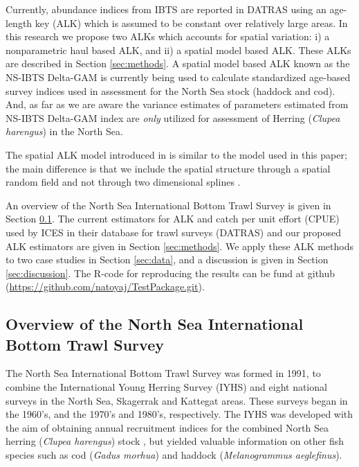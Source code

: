 \documentclass[a4paper 12pt]{article}
\numberwithin{equation}{section}
\begin{document}
Currently, abundance indices from IBTS are reported in DATRAS \citep{datras} using an age-length key (ALK) \citep{fridriksson1934calculation} which is assumed to be constant over relatively large areas. In this research we propose two ALKs which accounts for spatial variation: i) a nonparametric  haul based ALK, and ii) a spatial model based ALK. These ALKs are described in Section \ref{sec:methods}. %
A spatial model based ALK \citep{berg2012spatial, berg2014evaluation} known as the NS-IBTS Delta-GAM \citep{ICES2016b} is currently being used to calculate standardized age-based survey indices used in assessment for the North Sea stock (haddock and cod). And, as far as we are aware the variance estimates of parameters estimated from NS-IBTS Delta-GAM index  are \textit{only} utilized for assessment of Herring (\textit{Clupea harengus}) in the North Sea.

The spatial ALK model introduced in \citet{berg2012spatial} is similar to the model used in this paper; the main difference is that we include the spatial structure through a spatial random field \citep{lindgren2011explicit} and not through two dimensional splines \citep{wood2017generalized}.

 An  overview of the  North Sea International Bottom Trawl Survey is given in Section \ref{overview}. The current estimators for ALK and catch per unit effort (CPUE) used by ICES in their database for trawl surveys (DATRAS) and our proposed ALK estimators are given in Section \ref{sec:methods}. We apply these ALK methods to two case studies in Section  \ref{sec:data}, and a discussion is given in Section \ref{sec:discussion}. The R-code for reproducing the results can be fund at github (\href{https://github.com/natoyaj/TestPackage.git}{https://github.com/natoyaj/TestPackage.git}).
 

\subsection{Overview of the North Sea International Bottom Trawl Survey}
\label{overview}
\indent The North Sea International Bottom Trawl Survey was formed in 1991, to combine the International Young Herring Survey (IYHS) and eight national surveys in the North Sea, Skagerrak and Kattegat areas. These surveys began in the 1960's, and the 1970's and 1980's, respectively. The IYHS was developed with the aim of obtaining annual recruitment indices for the combined North Sea herring (\textit{Clupea harengus}) stock \citep{ICES2012}, but yielded valuable information on other fish species such as cod (\textit{Gadus morhua}) and haddock (\textit{Melanogrammus aeglefinus}).
\end{document}
